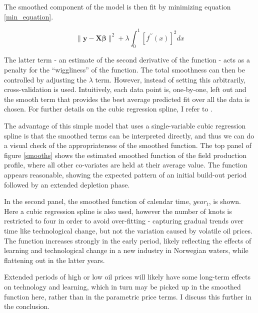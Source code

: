\documentclass[12pt]{article}
\begin{document}
The smoothed component of the model is then fit by minimizing equation \ref{min_equation}.

\begin{equation}
\| \mathbf{y} - \mathbf{X\beta} \| ^2 + \lambda \int_{0}^{1} [f^{\prime \prime}(x)]^2 dx
\label{min_equation}
\end{equation}

The latter term - an estimate of the second derivative of the function - acts as a penalty for the ``wiggliness'' of the function. The total smoothness can then be controlled by adjusting the $\lambda$ term. However, instead of setting this arbitrarily, cross-validation is used. Intuitively, each data point is, one-by-one, left out and the smooth term that provides the best average predicted fit over all the data is chosen.  For further details on the cubic regression spline, I refer to \citet{wood_generalized_2006}.

The advantage of this simple model that uses a single-variable cubic regression spline is that the smoothed terms can be interpreted directly, and thus we can do a visual check of the appropriateness of the smoothed function. The top panel of figure \ref{smooths} shows the estimated smoothed function of the field production profile, where all other co-variates are held at their average value.  The function appears reasonable, showing the expected pattern of an initial build-out period followed by an extended depletion phase. 

In the second panel, the smoothed function of calendar time, $year_t$, is shown. Here a cubic regression spline is also used, however the number of knots is restricted to four in order to avoid over-fitting - capturing gradual trends over time like technological change, but not the variation caused by volatile oil prices. The function increases strongly in the early period, likely reflecting the effects of learning and technological change in a new industry in Norwegian waters, while flattening out in the latter years. 

Extended periods of high or low oil prices will likely have some long-term effects on technology and learning, which in turn may be picked up in the smoothed function here, rather than in the parametric price terms.  I discuss this further in the conclusion.  
\end{document}
